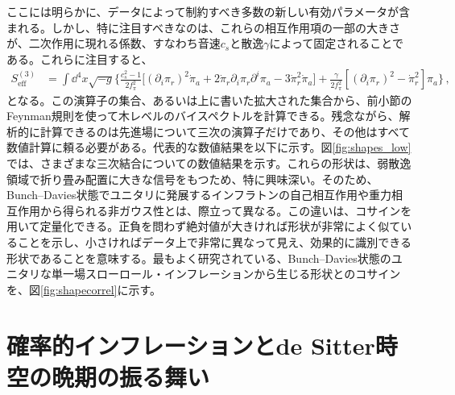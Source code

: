 \documentclass[a4paper,11pt,oneside]{article}
\theoremstyle{definition}
\numberwithin{equation}{section}
\newcommand{\fpi}{f_{\pi}}
\newcommand{\pir}{\pi_{r}}
\newcommand{\pia}{\pi_{a}}
\newcommand{\dpir}{\dot{\pi}_{r}}
\newcommand{\dpia}{\dot{\pi}_{a}}
\begin{document}
ここには明らかに、データによって制約すべき多数の新しい有効パラメータが含まれる。しかし、特に注目すべきなのは、これらの相互作用項の一部の大きさが、二次作用に現れる係数、すなわち音速$  c_{s} $と散逸$  \gamma $によって固定されることである\cite{LopezNacir:2011kk}。これらに注目すると、
\begin{align}
    S^{(3)}_{\mathrm{eff}} &= \int \dd^4 x \sqrt{-g} \bigg\{\frac{c_{s}^{2}-1}{2\fpi^{2}}\Big[\left(\partial_{i}\pir\right)^{2} \dpia +2\dpir\partial_{i}\pir\partial^{i}\pia    - 3 \dpir^{2} \dpia\Big] +\frac{\gamma}{2\fpi^{2}}\left[\left(\partial_{i}\pir\right)^{2}-\dpir^{2}\right] \pia \bigg\}\,, \nonumber
\end{align}
となる。この演算子の集合、あるいは上に書いた拡大された集合から、前小節のFeynman規則を使って木レベルのバイスペクトルを計算できる。残念ながら、解析的に計算できるのは先進場について三次の演算子だけであり、その他はすべて数値計算に頼る必要がある。代表的な数値結果を以下に示す。図\ref{fig:shapes_low}では、さまざまな三次結合についての数値結果を示す。これらの形状は、弱散逸領域で折り畳み配置に大きな信号をもつため、特に興味深い。そのため、Bunch--Davies状態でユニタリに発展するインフラトンの自己相互作用や重力相互作用から得られる非ガウス性とは、際立って異なる。この違いは、コサイン\cite{Babich:2004gb}を用いて定量化できる。正負を問わず絶対値が大きければ形状が非常によく似ていることを示し、小さければデータ上で非常に異なって見え、効果的に識別できる形状であることを意味する。最もよく研究されている、Bunch--Davies状態のユニタリな単一場スローロール・インフレーションから生じる形状とのコサインを、図\ref{fig:shapecorrel}に示す\cite{Salcedo:2026sdn}。





 

\section{確率的インフレーションとde Sitter時空の晩期の振る舞い}\label{sec:stochastic}
\end{document}
